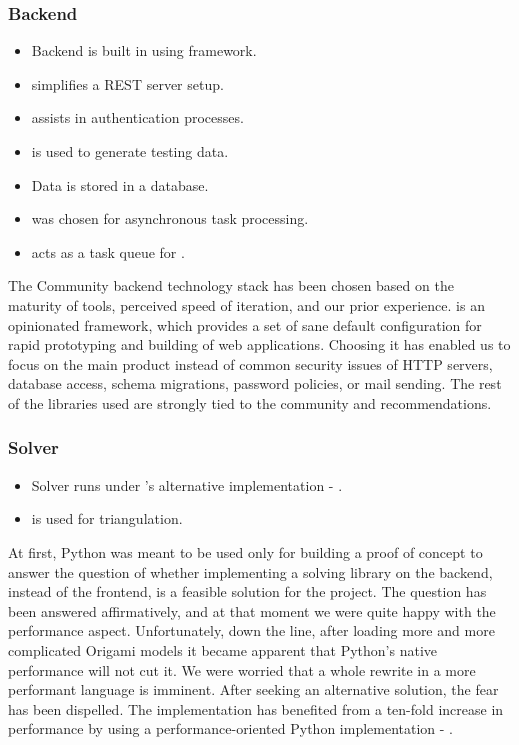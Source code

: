 \subsubsection{Backend}

\begin{itemize}
	\item Backend is built in  using  framework. 
	\item {} simplifies a REST server setup.
	\item {} assists in authentication processes.
	\item {} is used to generate testing data.
	\item Data is stored in a  database.
	\item {} was chosen for asynchronous task processing.
	\item {} acts as a task queue for .
\end{itemize}

The Community backend technology stack has been chosen based on the maturity of tools, perceived speed of iteration, and our prior experience.  is an opinionated framework, which provides a set of sane default configuration for rapid prototyping and building of web applications. Choosing it has enabled us to focus on the main product instead of common security issues of HTTP servers, database access, schema migrations, password policies, or mail sending. The rest of the libraries used are strongly tied to the  community and recommendations.

\subsubsection{Solver}

\begin{itemize}
	\item Solver runs under 's alternative implementation - .
	\item {} is used for triangulation.
\end{itemize}

At first, Python was meant to be used only for building a proof of concept to answer the question of whether implementing a solving library on the backend, instead of the frontend, is a feasible solution for the project. The question has been answered affirmatively, and at that moment we were quite happy with the performance aspect. Unfortunately, down the line, after loading more and more complicated Origami models it became apparent that Python's native performance will not cut it. We were worried that a whole rewrite in a more performant language is imminent. After seeking an alternative solution, the fear has been dispelled. The implementation has benefited from a ten-fold increase in performance by using a performance-oriented Python implementation - .


